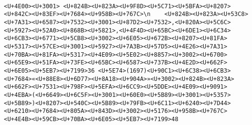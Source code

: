 \documentclass[
]{article}
\begin{document}
\begin{verbatim}
                                                                                                                                                                                                                                                                                                                                                                                                                                                                                                                                                                                                                                                                                                                                                                                                                                                                                                                                                                                                                                                                                                                                                                                                                                                                                                                                                                                                                                                                                                                                                                                                                                                                                                                                                                                                                                                                                                                                                                                                                                                                                               <U+4E00><U+3001> <U+824B><U+823A><U+9F8D><U+5C71><U+5BFA><U+8207><U+842C><U+83EF><U+7684><U+958B><U+767C>\n    <U+824B><U+823A><U+53C8><U+7A31><U+6587><U+7532><U+3001><U+87D2><U+7532>,<U+820A><U+5C6C><U+5927><U+52A0><U+868B><U+5821>,<U+4F4D><U+65BC><U+6DE1><U+6C34><U+6CB3><U+6771><U+5CB8><U+3002><U+6E05><U+672B><U+8207><U+81FA><U+5317><U+57CE><U+3001><U+5927><U+7A3B><U+57D5><U+4E26><U+7A31><U+70BA><U+81FA><U+5317><U+4E09><U+5E02><U+8857><U+3002><U+6700><U+65E9><U+51FA><U+73FE><U+65BC><U+6587><U+737B><U+4E2D><U+662F><U+6E05><U+5EB7><U+7199>36 <U+5E74>(1697)<U+90C1><U+6C38><U+6CB3><U+7684>«<U+88E8><U+6D77><U+8A18><U+904A>»<U+3002><U+824B><U+823A><U+662F><U+7531><U+798F><U+5EFA><U+6CC9><U+5DDE><U+4E09><U+9091><U+4EBA>(<U+6649><U+6C5F><U+3001><U+60E0><U+5B89><U+3001><U+5357><U+5B89>)<U+8207><U+540C><U+5B89><U+79FB><U+6C11><U+6240><U+7D44><U+6210><U+7684><U+805A><U+843D><U+3002><U+5176><U+958B><U+767C><U+4E4B><U+59CB><U+70BA><U+6E05><U+5EB7><U+7199>48 
\end{verbatim}
\end{document}
